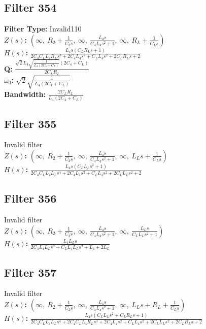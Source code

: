 \documentclass{article}
\begin{document}
\subsection*{Filter 354}
\textbf{Filter Type:} Invalid110 \\ 
\textbf{$Z(s)$:} $\left( \infty, \  R_{2} + \frac{1}{C_{2} s}, \  \infty, \  \frac{L_{4} s}{C_{4} L_{4} s^{2} + 1}, \  \infty, \  R_{L} + \frac{1}{C_{L} s}\right)$ \\ 
\textbf{$H(s)$:} $\frac{L_{4} s \left(C_{L} R_{L} s + 1\right)}{2 C_{4} C_{L} L_{4} R_{L} s^{3} + 2 C_{4} L_{4} s^{2} + C_{L} L_{4} s^{2} + 2 C_{L} R_{L} s + 2}$ \\ 
\textbf{Q:} $\frac{\sqrt{2} L_{4} \sqrt{\frac{1}{L_{4} \left(2 C_{4} + C_{L}\right)}} \left(2 C_{4} + C_{L}\right)}{2 C_{L} R_{L}}$ \\ 
\textbf{$\omega_0$:} $\sqrt{2} \sqrt{\frac{1}{L_{4} \left(2 C_{4} + C_{L}\right)}}$ \\ 
\textbf{Bandwidth:} $\frac{2 C_{L} R_{L}}{L_{4} \left(2 C_{4} + C_{L}\right)}$ \\ 
\subsection*{Filter 355}
Invalid filter \\ 
\textbf{$Z(s)$:} $\left( \infty, \  R_{2} + \frac{1}{C_{2} s}, \  \infty, \  \frac{L_{4} s}{C_{4} L_{4} s^{2} + 1}, \  \infty, \  L_{L} s + \frac{1}{C_{L} s}\right)$ \\ 
\textbf{$H(s)$:} $\frac{L_{4} s \left(C_{L} L_{L} s^{2} + 1\right)}{2 C_{4} C_{L} L_{4} L_{L} s^{4} + 2 C_{4} L_{4} s^{2} + C_{L} L_{4} s^{2} + 2 C_{L} L_{L} s^{2} + 2}$ \\ 
\subsection*{Filter 356}
Invalid filter \\ 
\textbf{$Z(s)$:} $\left( \infty, \  R_{2} + \frac{1}{C_{2} s}, \  \infty, \  \frac{L_{4} s}{C_{4} L_{4} s^{2} + 1}, \  \infty, \  \frac{L_{L} s}{C_{L} L_{L} s^{2} + 1}\right)$ \\ 
\textbf{$H(s)$:} $\frac{L_{4} L_{L} s}{2 C_{4} L_{4} L_{L} s^{2} + C_{L} L_{4} L_{L} s^{2} + L_{4} + 2 L_{L}}$ \\ 
\subsection*{Filter 357}
Invalid filter \\ 
\textbf{$Z(s)$:} $\left( \infty, \  R_{2} + \frac{1}{C_{2} s}, \  \infty, \  \frac{L_{4} s}{C_{4} L_{4} s^{2} + 1}, \  \infty, \  L_{L} s + R_{L} + \frac{1}{C_{L} s}\right)$ \\ 
\textbf{$H(s)$:} $\frac{L_{4} s \left(C_{L} L_{L} s^{2} + C_{L} R_{L} s + 1\right)}{2 C_{4} C_{L} L_{4} L_{L} s^{4} + 2 C_{4} C_{L} L_{4} R_{L} s^{3} + 2 C_{4} L_{4} s^{2} + C_{L} L_{4} s^{2} + 2 C_{L} L_{L} s^{2} + 2 C_{L} R_{L} s + 2}$ \\ 
\end{document}
